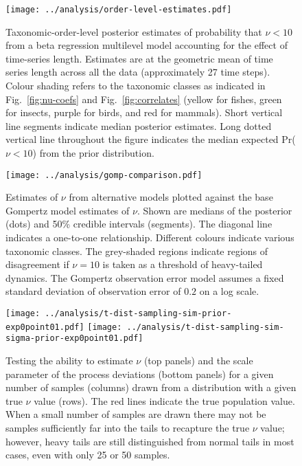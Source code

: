 \clearpage

\begin{figure}[htbp]
\begin{center}
\texttt{[image: ../analysis/order-level-estimates.pdf]}
\caption{
  Taxonomic-order-level posterior estimates of probability that $\nu < 10$ from
  a beta regression multilevel model accounting for the effect of time-series
  length. Estimates are at the geometric mean of time series length across all
  the data (approximately 27 time steps). Colour shading refers to the
  taxonomic classes as indicated in Fig.~\ref{fig:nu-coefs} and
  Fig.~\ref{fig:correlates} (yellow for fishes, green for insects, purple for
  birds, and red for mammals). Short vertical line segments indicate median
  posterior estimates. Long dotted vertical line throughout the figure
  indicates the median expected Pr($\nu < 10$) from the prior distribution.
}
\label{fig:order-estimates}
\end{center}
\end{figure}

\clearpage

\begin{figure}[htbp]
\begin{center}
\texttt{[image: ../analysis/gomp-comparison.pdf]}
\caption{
  Estimates of $\nu$ from alternative models plotted against the base Gompertz
  model estimates of $\nu$. Shown are medians of the posterior (dots) and 50\%
  credible intervals (segments). The diagonal line indicates a one-to-one
  relationship. Different colours indicate various taxonomic classes. The
  grey-shaded regions indicate regions of disagreement if $\nu = 10$ is taken
  as a threshold of heavy-tailed dynamics. The Gompertz observation error model
  assumes a fixed standard deviation of observation error of $0.2$ on a log
  scale.
}
\label{fig:alt}
\end{center}
\end{figure}

\clearpage

\begin{figure}[htbp]
\begin{center}
\texttt{[image: ../analysis/t-dist-sampling-sim-prior-exp0point01.pdf]}
\texttt{[image: ../analysis/t-dist-sampling-sim-sigma-prior-exp0point01.pdf]}
\caption{
  Testing the ability to estimate $\nu$ (top panels) and the scale parameter of
  the process deviations (bottom panels) for a given number of samples (columns)
  drawn from a distribution with a given true $\nu$ value (rows). The red lines
  indicate the true population value. When a small number of samples are drawn
  there may not be samples sufficiently far into the tails to recapture the
  true $\nu$ value; however, heavy tails are still distinguished from normal
  tails in most cases, even with only 25 or 50 samples.
}
\label{fig:sim-nu}
\end{center}
\end{figure}

